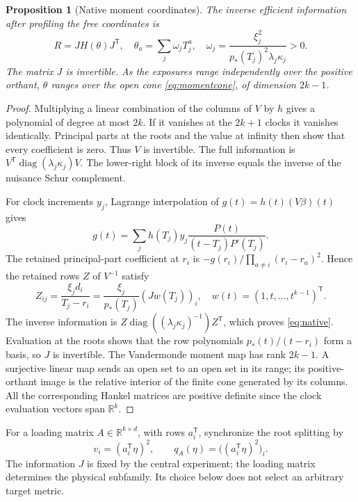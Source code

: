 \documentclass[11pt,reqno]{amsart}
\numberwithin{equation}{section}
\newtheorem{proposition}[theorem]{Proposition}
\theoremstyle{definition}\newtheorem{definition}[theorem]{Definition}
\theoremstyle{remark}\newtheorem{remark}[theorem]{Remark}
\newcommand{\R}{\mathbb R}
\newcommand{\diag}{\operatorname{diag}}
\begin{document}
\begin{proposition}[Native moment coordinates]\label{prop:native}
The inverse efficient information after profiling the free coordinates is
\begin{equation}\label{eq:native}
 R=JH(\theta)J^{\mathsf T},\quad
 \theta_a=\sum_j\omega_jT_j^a,\quad
 \omega_j=\frac{\xi_j^2}{p_*(T_j)^2\lambda_j\kappa_j}>0.
\end{equation}
The matrix $J$ is invertible. As the exposures range independently over the positive orthant, $\theta$ ranges over the open cone \eqref{eq:momentcone}, of dimension $2k-1$.
\end{proposition}
\begin{proof}
Multiplying a linear combination of the columns of $V$ by $h$ gives a polynomial of degree at most $2k$. If it vanishes at the $2k+1$ clocks it vanishes identically. Principal parts at the roots and the value at infinity then show that every coefficient is zero. Thus $V$ is invertible. The full information is $V^{\mathsf T}\diag(\lambda_j\kappa_j)V$. The lower-right block of its inverse equals the inverse of the nuisance Schur complement.

For clock increments $y_j$, Lagrange interpolation of $g(t)=h(t)(V\beta)(t)$ gives
\[
 g(t)=\sum_j h(T_j)y_j\frac{P(t)}{(t-T_j)P'(T_j)}.
\]
The retained principal-part coefficient at $r_i$ is $-g(r_i)/\prod_{a\ne i}(r_i-r_a)^2$. Hence the retained rows $Z$ of $V^{-1}$ satisfy
\[
 Z_{ij}=\frac{\xi_jd_i}{T_j-r_i}
       =\frac{\xi_j}{p_*(T_j)}(Jw(T_j))_i,\quad
 w(t)=(1,t,\ldots,t^{k-1})^{\mathsf T}.
\]
The inverse information is $Z\diag((\lambda_j\kappa_j)^{-1})Z^{\mathsf T}$, which proves \eqref{eq:native}. Evaluation at the roots shows that the row polynomials $p_*(t)/(t-r_i)$ form a basis, so $J$ is invertible. The Vandermonde moment map has rank $2k-1$. A surjective linear map sends an open set to an open set in its range; its positive-orthant image is the relative interior of the finite cone generated by its columns. All the corresponding Hankel matrices are positive definite since the clock evaluation vectors span $\R^k$.
\end{proof}

For a loading matrix $A\in\R^{k\times d}$, with rows $a_i^{\mathsf T}$, synchronize the root splitting by
\[
 v_i=(a_i^{\mathsf T}\eta)^2,
 \qquad q_A(\eta)=\big((a_i^{\mathsf T}\eta)^2\big)_i.
\]
The information $J$ is fixed by the central experiment; the loading matrix determines the physical subfamily. Its choice below does not select an arbitrary target metric.
\end{document}
